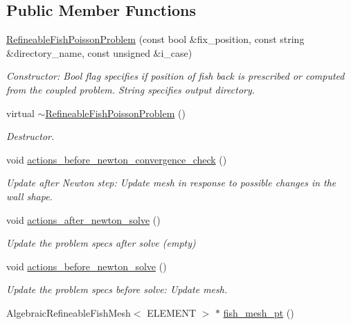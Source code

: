 \subsection*{Public Member Functions}
\begin{DoxyCompactItemize}
\item 
\hyperlink{classRefineableFishPoissonProblem_a2585d906fab348e09bfb9b4c111ac161}{Refineable\+Fish\+Poisson\+Problem} (const bool \&fix\+\_\+position, const string \&directory\+\_\+name, const unsigned \&i\+\_\+case)
\begin{DoxyCompactList}\small\item\em Constructor\+: Bool flag specifies if position of fish back is prescribed or computed from the coupled problem. String specifies output directory. \end{DoxyCompactList}\item 
virtual \hyperlink{classRefineableFishPoissonProblem_a7039a3409520850908940927b91af9ab}{$\sim$\+Refineable\+Fish\+Poisson\+Problem} ()
\begin{DoxyCompactList}\small\item\em Destructor. \end{DoxyCompactList}\item 
void \hyperlink{classRefineableFishPoissonProblem_a8d8fb7ef1c571c57c02073edab4a7759}{actions\+\_\+before\+\_\+newton\+\_\+convergence\+\_\+check} ()
\begin{DoxyCompactList}\small\item\em Update after Newton step\+: Update mesh in response to possible changes in the wall shape. \end{DoxyCompactList}\item 
void \hyperlink{classRefineableFishPoissonProblem_a7f6c356f7c8bd0130de957297e999f40}{actions\+\_\+after\+\_\+newton\+\_\+solve} ()
\begin{DoxyCompactList}\small\item\em Update the problem specs after solve (empty) \end{DoxyCompactList}\item 
void \hyperlink{classRefineableFishPoissonProblem_a58098181f3b88c2fc65f24fb15c1a529}{actions\+\_\+before\+\_\+newton\+\_\+solve} ()
\begin{DoxyCompactList}\small\item\em Update the problem specs before solve\+: Update mesh. \end{DoxyCompactList}\item 
Algebraic\+Refineable\+Fish\+Mesh$<$ E\+L\+E\+M\+E\+NT $>$ $\ast$ \hyperlink{classRefineableFishPoissonProblem_a6f25d5110e5262e66e2900da051567a6}{fish\+\_\+mesh\+\_\+pt} ()

\end{DoxyCompactItemize}
